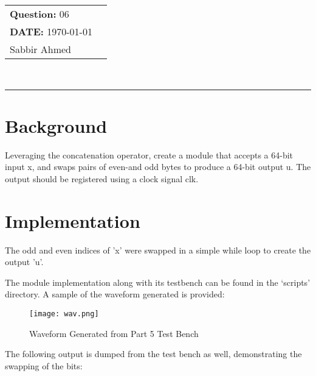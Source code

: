 \documentclass[paper=usletter, fontsize=12pt]{article}
\newcommand{\documentinfo}[3]{
    \begin{centering}
        \parbox{2in}{
        \begin{spacing}{1}
            \begin{flushleft}
                \begin{tabular}{l l}
                    #1 \\
                    #2 \\
                    #3 \\
                \end{tabular}\\
                \rule{\textwidth}{1pt}
            \end{flushleft}
        \end{spacing}
        }
    \end{centering}
}
\begin{document}
    \documentinfo{\textbf{Question:} 06}{\textbf{DATE:} \today}{Sabbir Ahmed}
    \vspace{-0.1in}

    \section{Background}
    Leveraging the concatenation operator, create a module that accepts a 64-bit input x, and swaps pairs of even-and odd bytes to produce a 64-bit output u. The output should be registered using a clock signal clk.

    \section{Implementation}
    The odd and even indices of 'x' were swapped in a simple while loop to create the output 'u'.

    The module implementation along with its testbench can be found in the `scripts' directory. A sample of the waveform generated is provided:

    \begin{figure}[ht]
        \begin{center}
            \texttt{[image: wav.png]}
            \caption{Waveform Generated from Part 5 Test Bench} \label{fig:wav}
        \end{center}
    \end{figure}

    The following output is dumped from the test bench as well, demonstrating the swapping of the bits:
\end{document}
